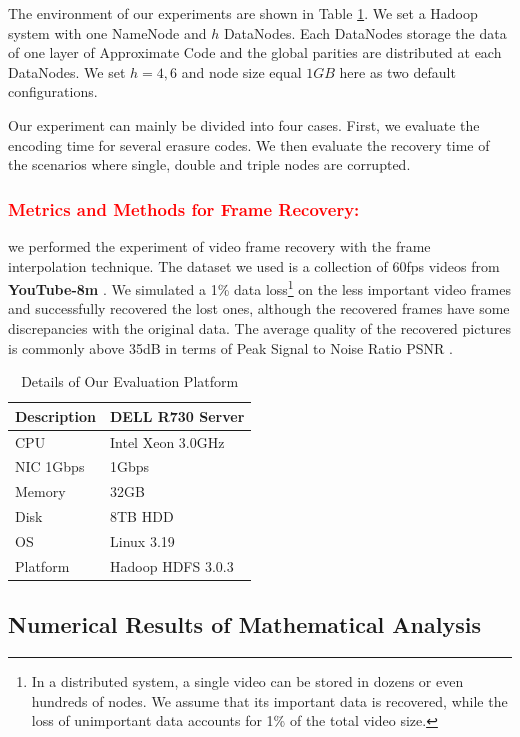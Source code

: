 \documentclass[sigconf]{acmart}
\begin{document}
The environment of our experiments are shown in Table \ref{tab-platform}. We set a Hadoop system with one NameNode and $h$ DataNodes. Each DataNodes storage the data of one layer of Approximate Code and the global parities are distributed at each DataNodes. We set $h=4,6$ and node size equal $1GB$ here as two default configurations.

Our experiment can mainly be divided into four cases. First, we evaluate the encoding time for several erasure codes. We then evaluate the recovery time of the scenarios where single, double and triple nodes are corrupted.

\subsubsection{\textcolor{red}{Metrics and Methods for Frame Recovery: }}
we performed the experiment of video frame recovery with the frame interpolation technique. The dataset we used is a collection of 60fps videos from \textbf{YouTube-8m} \cite{youtube8m}. We simulated a 1\% data loss\footnote{In a distributed system, a single video can be stored in dozens or even hundreds of nodes. We assume that its important data is recovered, while the loss of unimportant data accounts for 1\% of the total video size.} on the less important video frames and successfully recovered the lost ones, although the recovered frames have some discrepancies with the original data. The average quality of the recovered pictures is commonly above 35dB in terms of Peak Signal to Noise Ratio PSNR .

\begin{table}[!ht]
\begin{tabular}{|l|l|}
\hline
Description & DELL R730 Server \\ \hline
CPU & Intel Xeon 3.0GHz \\ \hline
NIC 1Gbps & 1Gbps \\ \hline
Memory & 32GB \\ \hline
Disk & 8TB HDD \\ \hline
OS & Linux 3.19 \\ \hline
Platform & Hadoop HDFS 3.0.3 \\ \hline
\end{tabular}
\caption{Details of Our Evaluation Platform}\label{tab-platform}
\end{table}

\subsection{Numerical Results of Mathematical Analysis}
\end{document}
